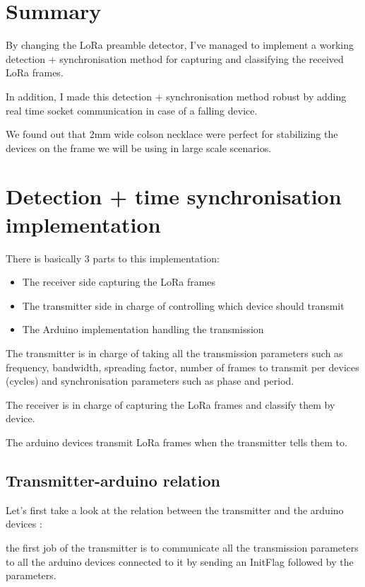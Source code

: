 \documentclass[a4paper, 12pt]{article}
\begin{document}
\section{Summary}
By changing the LoRa preamble detector, I've managed to implement a working detection + synchronisation method for capturing and classifying the received LoRa frames.

In addition, I made this detection + synchronisation method robust by adding real time socket communication in case of a falling device. 

We found out that 2mm wide colson necklace were perfect for stabilizing the devices on the frame we will be using in large scale scenarios.


\section{Detection + time synchronisation implementation} \label{TSi}
There is basically 3 parts to this implementation: 
\begin{itemize}
  \item The receiver side capturing the LoRa frames
  \item The transmitter side in charge of controlling which device should transmit
  \item The Arduino implementation handling the transmission
\end{itemize}

The transmitter is in charge of taking all the transmission parameters such as frequency, bandwidth, spreading factor, number of frames to transmit per devices (cycles) and synchronisation parameters such as phase and period.

The receiver is in charge of capturing the LoRa frames and classify them by device.

The arduino devices transmit LoRa frames when the transmitter tells them to.

\vspace{1cm}

\subsection{Transmitter-arduino relation}
Let's first take a look at the relation between the transmitter and the arduino devices :

the first job of the transmitter is to communicate all the transmission parameters to all the arduino devices connected to it by sending an InitFlag followed by the parameters. 
\end{document}
